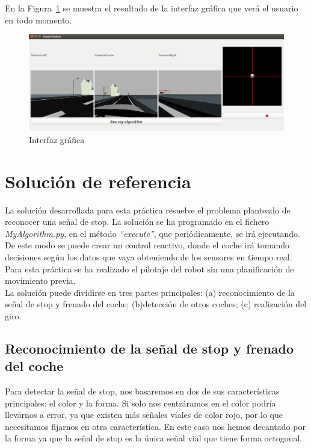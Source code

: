 En la Figura~\ref{fig.stopGUI} se muestra el resultado de la interfaz gráfica que verá el usuario en todo momento.

\begin{figure}[H]
  \begin{center}
    \includegraphics[width=1.0\textwidth]{figures/Stop/stopGUI.png}
		\caption{Interfaz gráfica}
		\label{fig.stopGUI}
		\end{center}
\end{figure}


\section{Solución de referencia}
La solución desarrollada para esta práctica resuelve el problema planteado de reconocer una señal de stop. La solución se ha programado en el fichero \textit{MyAlgorithm.py}, en el método \textit{``execute''}, que periódicamente, se irá ejecutando. De este modo se puede crear un control reactivo, donde el coche irá tomando decisiones según los datos que vaya obteniendo de los sensores en tiempo real. Para esta práctica se ha realizado el pilotaje del robot sin una planificación de movimiento previa.\\

La solución puede dividirse en tres partes principales: (a) reconocimiento de la señal de stop y frenado del coche; (b)detección de otros coches; (c) realización del giro. 

\subsection{Reconocimiento de la señal de stop y frenado del coche}
Para detectar la señal de stop, nos basaremos en dos de sus características principales: el color y la forma. Si solo nos centráramos en el color podría llevarnos a error, ya que existen más señales viales de color rojo, por lo que necesitamos fijarnos en otra característica. En este caso nos hemos decantado por la forma ya que la señal de stop es la única señal vial que tiene forma octogonal. \\

